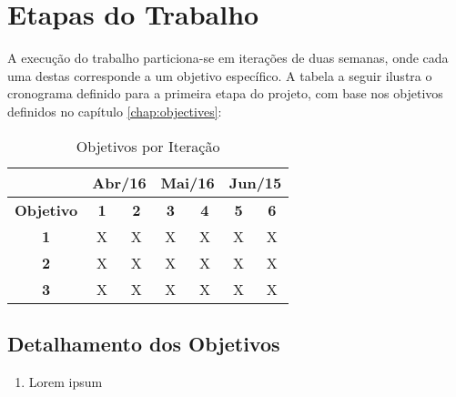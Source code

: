 \chapter{\label{chap:work-plan}Etapas do Trabalho}

A execução do trabalho particiona-se em iterações de duas semanas, onde cada
uma destas corresponde a um objetivo específico. A tabela a seguir ilustra o
cronograma definido para a primeira etapa do projeto, com base nos objetivos
definidos no capítulo \ref{chap:objectives}:

\begin{table}[htb!]
\centering
\caption{Objetivos por Iteração}
\label{tab:work-plan}
\begin{tabular}{c|c|c|c|c|c|c|}
\cline{2-7}
{\bf}                                 & \multicolumn{2}{c|}{{\bf Abr/16}}             & \multicolumn{2}{c|}{{\bf Mai/16}}             & \multicolumn{2}{c|}{{\bf Jun/15}} \\ \hline
\multicolumn{1}{|c|}{{\bf Objetivo}}  & {\bf 1}               & {\bf 2}               & {\bf 3}               & {\bf 4}               & {\bf 5}               & {\bf 6}   \\ \hline
\multicolumn{1}{|c|}{{\bf 1}}         & X                     & X                     & X                     & X                     & X                     & X   \\ \hline
\multicolumn{1}{|c|}{{\bf 2}}         & X                     & X                     & X                     & X                     & X                     & X   \\ \hline
\multicolumn{1}{|c|}{{\bf 3}}         & X                     & X                     & X                     & X                     & X                     & X   \\ \hline
\end{tabular}
\end{table}

\section{Detalhamento dos Objetivos}

\begin{enumerate}
    \item Lorem ipsum
\end{enumerate}
